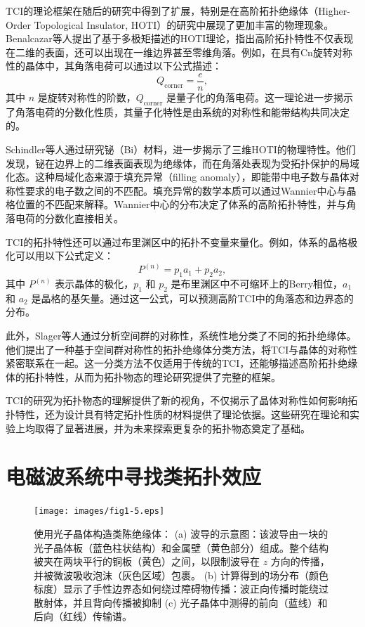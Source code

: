 TCI的理论框架在随后的研究中得到了扩展，特别是在高阶拓扑绝缘体（Higher-Order Topological Insulator, HOTI）的研究中展现了更加丰富的物理现象\cite{f3}。Benalcazar等人提出了基于多极矩描述的HOTI理论，指出高阶拓扑特性不仅表现在二维的表面，还可以出现在一维边界甚至零维角落。例如，在具有Cn旋转对称性的晶体中，其角落电荷可以通过以下公式描述：
\begin{equation} \label{eq1-8}
    Q_{\text{corner}} = \frac{e}{n},
\end{equation}
其中 \(n\) 是旋转对称性的阶数，\(Q_{\text{corner}}\) 是量子化的角落电荷。这一理论进一步揭示了角落电荷的分数化性质，其量子化特性是由系统的对称性和能带结构共同决定的。

Schindler等人通过研究铋（Bi）材料，进一步揭示了三维HOTI的物理特性\cite{f4}。他们发现，铋在边界上的二维表面表现为绝缘体，而在角落处表现为受拓扑保护的局域化态。这种局域化态来源于填充异常（filling anomaly），即能带中电子数与晶体对称性要求的电子数之间的不匹配。填充异常的数学本质可以通过Wannier中心与晶格位置的不匹配来解释。Wannier中心的分布决定了体系的高阶拓扑特性，并与角落电荷的分数化直接相关。

TCI的拓扑特性还可以通过布里渊区中的拓扑不变量来量化。例如，体系的晶格极化可以用以下公式定义：
\begin{equation} \label{eq1-9}
    P^{(n)} = p_1 a_1 + p_2 a_2,
\end{equation}
其中 \(P^{(n)}\) 表示晶体的极化，\(p_1\) 和 \(p_2\) 是布里渊区中不可缩环上的Berry相位，\(a_1\) 和 \(a_2\) 是晶格的基矢量。通过这一公式，可以预测高阶TCI中的角落态和边界态的分布。

此外，Slager等人通过分析空间群的对称性，系统性地分类了不同的拓扑绝缘体\cite{f5}。他们提出了一种基于空间群对称性的拓扑绝缘体分类方法，将TCI与晶体的对称性紧密联系在一起。这一分类方法不仅适用于传统的TCI，还能够描述高阶拓扑绝缘体的拓扑特性，从而为拓扑物态的理论研究提供了完整的框架。

TCI的研究为拓扑物态的理解提供了新的视角，不仅揭示了晶体对称性如何影响拓扑特性，还为设计具有特定拓扑性质的材料提供了理论依据。这些研究在理论和实验上均取得了显著进展，并为未来探索更复杂的拓扑物态奠定了基础。 


\section{电磁波系统中寻找类拓扑效应}

\begin{figure}[h!]
    \centering
    \texttt{[image: images/fig1-5.eps]} 
    \caption{使用光子晶体构造类陈绝缘体\cite{g2}：
    (a) 波导的示意图：该波导由一块的光子晶体板（蓝色柱状结构）和金属壁（黄色部分）组成。整个结构被夹在两块平行的铜板（黄色）之间，以限制波导在 \( z \) 方向的传播，并被微波吸收泡沫（灰色区域）包裹。
    (b) 计算得到的场分布（颜色标度）显示了手性边界态如何绕过障碍物传播：波正向传播时能绕过散射体，并且背向传播被抑制
    (c) 光子晶体中测得的前向（蓝线）和后向（红线）传输谱。
    }
    \label{fig_1_5}
\end{figure}

